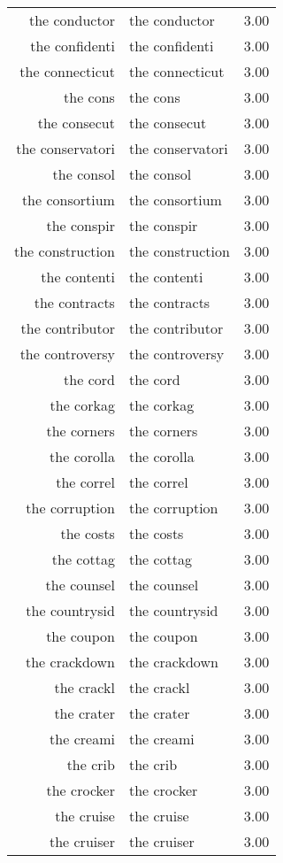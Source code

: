 \begin{table}[ht]
\begin{tabular}{rlr}
  the conductor & the conductor & 3.00 \\ 
  the confidenti & the confidenti & 3.00 \\ 
  the connecticut & the connecticut & 3.00 \\ 
  the cons & the cons & 3.00 \\ 
  the consecut & the consecut & 3.00 \\ 
  the conservatori & the conservatori & 3.00 \\ 
  the consol & the consol & 3.00 \\ 
  the consortium & the consortium & 3.00 \\ 
  the conspir & the conspir & 3.00 \\ 
  the construction & the construction & 3.00 \\ 
  the contenti & the contenti & 3.00 \\ 
  the contracts & the contracts & 3.00 \\ 
  the contributor & the contributor & 3.00 \\ 
  the controversy & the controversy & 3.00 \\ 
  the cord & the cord & 3.00 \\ 
  the corkag & the corkag & 3.00 \\ 
  the corners & the corners & 3.00 \\ 
  the corolla & the corolla & 3.00 \\ 
  the correl & the correl & 3.00 \\ 
  the corruption & the corruption & 3.00 \\ 
  the costs & the costs & 3.00 \\ 
  the cottag & the cottag & 3.00 \\ 
  the counsel & the counsel & 3.00 \\ 
  the countrysid & the countrysid & 3.00 \\ 
  the coupon & the coupon & 3.00 \\ 
  the crackdown & the crackdown & 3.00 \\ 
  the crackl & the crackl & 3.00 \\ 
  the crater & the crater & 3.00 \\ 
  the creami & the creami & 3.00 \\ 
  the crib & the crib & 3.00 \\ 
  the crocker & the crocker & 3.00 \\ 
  the cruise & the cruise & 3.00 \\ 
  the cruiser & the cruiser & 3.00 \\ 

\end{tabular}
\end{table}
